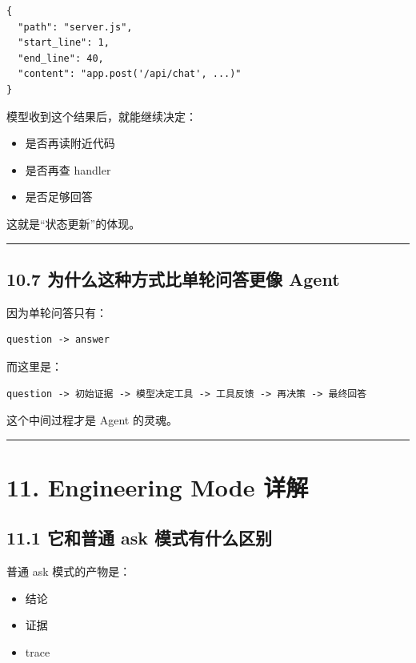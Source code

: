 \documentclass[UTF8,12pt,openany]{ctexbook}
\begin{document}
\begin{lstlisting}
{
  "path": "server.js",
  "start_line": 1,
  "end_line": 40,
  "content": "app.post('/api/chat', ...)"
}
\end{lstlisting}

模型收到这个结果后，就能继续决定：\par

\begin{itemize}
\item 是否再读附近代码
\item 是否再查 handler
\item 是否足够回答
\end{itemize}

这就是“状态更新”的体现。\par

\hrule

\subsection{10.7 为什么这种方式比单轮问答更像 Agent}

因为单轮问答只有：\par

\begin{lstlisting}
question -> answer
\end{lstlisting}

而这里是：\par

\begin{lstlisting}
question -> 初始证据 -> 模型决定工具 -> 工具反馈 -> 再决策 -> 最终回答
\end{lstlisting}

这个中间过程才是 Agent 的灵魂。\par

\hrule

\section{11. Engineering Mode 详解}

\subsection{11.1 它和普通 ask 模式有什么区别}

普通 ask 模式的产物是：\par

\begin{itemize}
\item 结论
\item 证据
\item trace
\end{itemize}
\end{document}
